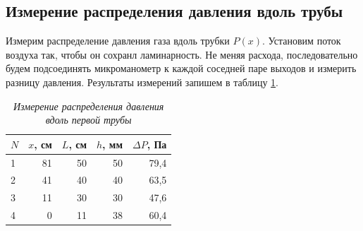 \documentclass[a4paper,12pt]{article}
\begin{document}

\subsection{Измерение распределения давления вдоль трубы}
\label{p:8}

Измерим распределение давления газа вдоль трубки $P(x)$. Установим поток воздуха так, чтобы он сохранл ламинарность. Не меняя расхода, последовательно будем подсоединять микроманометр к каждой соседней паре выходов и измерить разницу давления. Результаты измерений запишем в таблицу \ref{table:p-1}.

\begin{table}[!h]
    \centering
    \begin{tabular}{|l|r|r|r|r|}
    \hline
        $N$ & $x$, см & $L$, см & $h$, мм & $\Delta P$, Па \\ \hline
        1 & 81 & 50 & 50 & 79,4 \\ \hline
        2 & 41 & 40 & 40 & 63,5 \\ \hline
        3 & 11 & 30 & 30 & 47,6 \\ \hline
        4 & 0 & 11 & 38 & 60,4 \\ \hline
    \end{tabular}\caption{\textit{Измерение распределения давления вдоль первой трубы}}\label{table:p-1}
\end{table}
\end{document}
